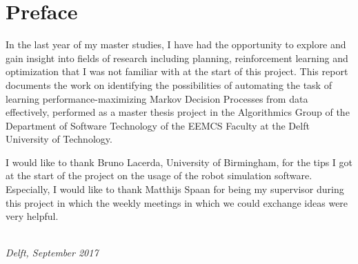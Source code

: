 \chapter*{Preface}


In the last year of my master studies, I have had the opportunity to explore and gain insight into fields of research including planning, reinforcement learning and optimization that I was not familiar with at the start of this project.
This report documents the work on identifying the possibilities of automating the task of learning performance-maximizing Markov Decision Processes from data effectively, performed as a master thesis project in the Algorithmics Group of the Department of Software Technology of the EEMCS Faculty at the Delft University of Technology.

I would like to thank Bruno Lacerda, University of Birmingham, for the tips I got at the start of the project on the usage of the robot simulation software.
Especially, I would like to thank Matthijs Spaan for being my supervisor during this project in which the weekly meetings in which we could exchange ideas were very helpful.

\begin{flushright}
{\makeatletter\itshape
    \@author \\
    Delft, September 2017
\makeatother}
\end{flushright}

%
%